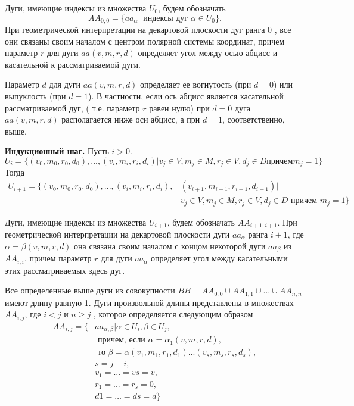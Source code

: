 \begin{remark}
Дуги, имеющие индексы из множества $U_0$,  будем обозначать 
$$AA_{0,0}  = \{aa_\alpha | \text{ индексы дуг } \alpha \in U_0 \}. $$
При геометрической интерпретации на декартовой плоскости дуг ранга 0 ,  все они связаны своим началом с центром полярной системы координат, причем параметр $r$  для дуги  $aa(v, m, r, d)$ определяет угол между осью абцисс и касательной к  рассматриваемой дуги.  

Параметр  $d$  для дуги   $aa(v, m, r, d)$  определяет  ее вогнутость (при $d = 0$) или  выпуклость (при $d = 1$).  В частности, если   ось абцисс является касательной  рассматриваемой дуг, ( т.е. параметр  $r$ равен нулю)  при  $d = 0$ дуга $aa(v, m, r, d)$ располагается ниже оси абцисс, а при $d = 1$, соответственно, выше.
\end{remark}

\textbf{Индукционный шаг.}  Пусть $i > 0$. 
$$U_i = \{ (v_0, m_0, r_0, d_0), ...,(v_i, m_i, r_i, d_i) | v_j \in V , m_j \in M , r_j \in V, d_j \in D  причем  m_j = 1\}$$
Тогда
\begin{equation}
\begin{split}
U_{i+1} = \{ (v_0, m_0, r_0, d_0), ...,(v_i, m_i, r_i, d_i),& (v_{i+1}, m_{i+1}, r_{i+1}, d_{i+1}) | \\
& v_j \in V , m_j \in M , r_j \in V, d_j \in D  \text{ причем }  m_j = 1\}
\label{overlaps:4}
\end{split}
\end{equation}

\begin{remark}
Дуги, имеющие индексы из множества $U_{i+1}$,  будем обозначать $AA_{i+1,i+1}$. 
При геометрической интерпретации на декартовой плоскости дуги  $aa_\alpha$  ранга $i+1$,  где  $\alpha = \beta(v, m, r, d)$  она  связана своим началом с концом некоторой дуги $aa_\beta$ из $AA_{i,i}$, причем параметр $r$ для дуги $aa_\alpha$  определяет угол между  касательными этих  рассматриваемых здесь  дуг.  
\end{remark}
Все определенные выше дуги из совокупности 
$BB = AA_{0,0} \cup AA_{1,1} \cup ... \cup AA_{n,n}$  имеют длину равную 1. Дуги произвольной длины представлены в множествах $AA_{i,j}$,  где $i  <  j$  и  $n \geq  j$ , которое определяется следующим образом  
\begin{equation}
\begin{split}
AA_{i,j} = \{&aa_{\alpha,\beta} | \alpha \in U_i, \beta \in U_j, \\
&\text{ причем, если }  \alpha = \alpha_1(v, m, r, d), \\
&\text{ то } \beta = \alpha(v_1, m_1, r_1, d_1) ... (v_s, m_s, r_{s}, d_s), \\
&s = j - i, \\
&v_1 = ... = vs = v, \\
&r_1 =...= r_s = 0, \\
& d1 = …= ds = d \}
\end{split}
\label{overlaps:5}
\end{equation}

